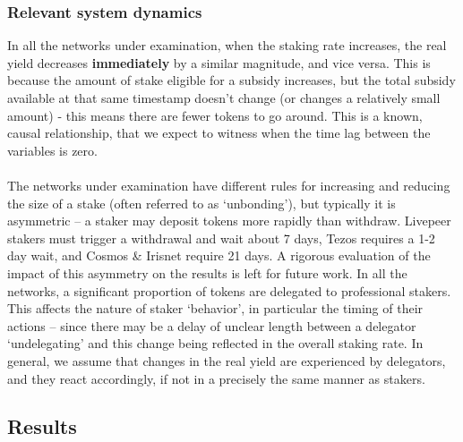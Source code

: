 \documentclass[longbibliography,nofootinbib]{revtex4-1}
\begin{document}
\subsubsection{Relevant system dynamics}\label{dynamics}

In all the networks under examination, when the staking rate increases, the real yield decreases \textbf{immediately} by a similar magnitude, and vice versa. This is because the amount of stake eligible for a subsidy increases, but the total subsidy available at that same timestamp doesn't change (or changes a relatively small amount) - this means there are fewer tokens to go around. This is a known, causal relationship, that we expect to witness when the time lag between the variables is zero. 
\\\\
The networks under examination have different rules for increasing and reducing the size of a stake (often referred to as `unbonding'), but typically it is asymmetric – a staker may deposit tokens more rapidly than withdraw. Livepeer stakers must trigger a withdrawal and wait about 7 days, Tezos requires a 1-2 day wait, and Cosmos \& Irisnet require 21 days. A rigorous evaluation of the impact of this asymmetry on the results is left for future work. In all the networks, a significant proportion of tokens are delegated to professional stakers. This affects the nature of staker `behavior', in particular the timing of their actions – since there may be a delay of unclear length between a delegator `undelegating' and this change being reflected in the overall staking rate. In general, we assume that changes in the real yield are experienced by delegators, and they react accordingly, if not in a precisely the same manner as stakers.

\subsection{Results}
\end{document}

